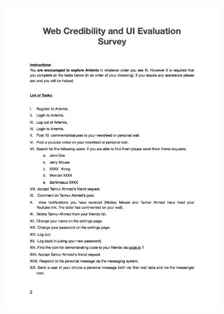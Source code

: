 \begin{figure}[H]
	\centering
	\includegraphics[scale=.7]{chapters/appendices/figures/2.png}
	\label{fig:2/6}
\end{figure}
\newpage

